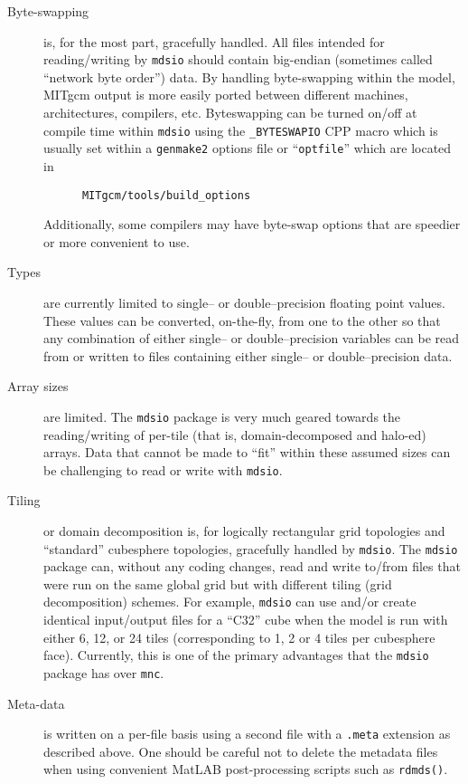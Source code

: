 \begin{description}
\item[Byte-swapping] is, for the most part, gracefully handled.  All
  files intended for reading/writing by \texttt{mdsio} should contain
  big-endian (sometimes called ``network byte order'') data.  By
  handling byte-swapping within the model, MITgcm output is more
  easily ported between different machines, architectures, compilers,
  etc.  Byteswapping can be turned on/off at compile time within
  \texttt{mdsio} using the \texttt{\_BYTESWAPIO} CPP macro which is
  usually set within a \texttt{genmake2} options file or
  ``\texttt{optfile}'' which are located in
\begin{verbatim}
      MITgcm/tools/build_options
\end{verbatim}
  Additionally, some compilers may have byte-swap options that are
  speedier or more convenient to use.

\item[Types] are currently limited to single-- or double--precision
  floating point values.  These values can be converted, on-the-fly,
  from one to the other so that any combination of either single-- or
  double--precision variables can be read from or written to files
  containing either single-- or double--precision data.

\item[Array sizes] are limited.  The \texttt{mdsio} package is very
  much geared towards the reading/writing of per-tile (that is,
  domain-decomposed and halo-ed) arrays.  Data that cannot be made to
  ``fit'' within these assumed sizes can be challenging to read or
  write with \texttt{mdsio}.

\item[Tiling] or domain decomposition is, for logically rectangular
  grid topologies and ``standard'' cubesphere topologies, gracefully
  handled by \texttt{mdsio}.  The \texttt{mdsio} package can, without
  any coding changes, read and write to/from files that were run on
  the same global grid but with different tiling (grid decomposition)
  schemes.  For example, \texttt{mdsio} can use and/or create
  identical input/output files for a ``C32'' cube when the model is
  run with either 6, 12, or 24 tiles (corresponding to 1, 2 or 4 tiles
  per cubesphere face).  Currently, this is one of the primary
  advantages that the \texttt{mdsio} package has over \texttt{mnc}.

\item[Meta-data] is written on a per-file basis using a second file
  with a \texttt{.meta} extension as described above.  One should be
  careful not to delete the metadata files when using convenient
  MatLAB post-processing scripts such as \texttt{rdmds()}.


\end{description}
